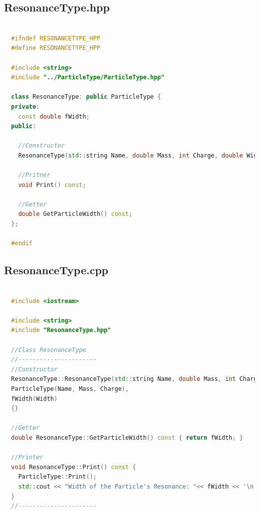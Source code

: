 \documentclass[a4paper, 11pt]{article}
\begin{document}
      \subsection{ResonanceType.hpp}
        \begin{lstlisting}[language=c++, style=code]

  #ifndef RESONANCETYPE_HPP
  #define RESONANCETYPE_HPP

  #include <string>
  #include "../ParticleType/ParticleType.hpp"

  class ResonanceType: public ParticleType {
  private:
    const double fWidth;
  public:

    //Constructor
    ResonanceType(std::string Name, double Mass, int Charge, double Width);

    //Pritner
    void Print() const;

    //Getter
    double GetParticleWidth() const;
  };

  #endif
        \end{lstlisting}
      \subsection{ResonanceType.cpp}
        \begin{lstlisting}[language=c++, style=code]

  #include <iostream>

  #include <string>
  #include "ResonanceType.hpp"

  //Class ResonanceType
  //----------------------
  //Constructor
  ResonanceType::ResonanceType(std::string Name, double Mass, int Charge, double Width):
  ParticleType(Name, Mass, Charge),
  fWidth(Width)
  {}

  //Getter
  double ResonanceType::GetParticleWidth() const { return fWidth; }

  //Printer
  void ResonanceType::Print() const {
    ParticleType::Print();
    std::cout << "Width of the Particle's Resonance: "<< fWidth << '\n';
  }
  //----------------------
        \end{lstlisting}
\end{document}
